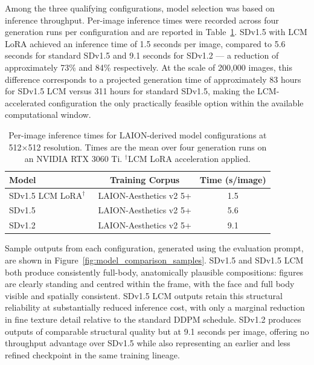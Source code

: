 Among the three qualifying configurations, model selection was based on
inference throughput. Per-image inference times were recorded across four
generation runs per configuration and are reported in
Table~\ref{tab:generative-model-inference-time}. SDv1.5 with LCM LoRA
achieved an inference time of 1.5 seconds per image, compared to 5.6
seconds for standard SDv1.5 and 9.1 seconds for SDv1.2 --- a reduction of
approximately 73\% and 84\% respectively. At the scale of 200{,}000 images,
this difference corresponds to a projected generation time of approximately
83 hours for SDv1.5 LCM versus 311 hours for standard SDv1.5, making the
LCM-accelerated configuration the only practically feasible option within
the available computational window.

\begin{table}[htbp]
	\centering
	\caption{Per-image inference times for LAION-derived model configurations
		at 512$\times$512 resolution. Times are the mean over four generation runs
		on an NVIDIA RTX 3060 Ti. $^\dagger$LCM LoRA acceleration applied.}
	\label{tab:generative-model-inference-time}
	\begin{tabular}{lcc}
		\toprule
		\textbf{Model} & \textbf{Training Corpus} & \textbf{Time (s/image)} \\
		\midrule
		SDv1.5 LCM LoRA$^\dagger$~\cite{StableDiffusion_2022_SD15modelcard, LCMLoRA_SDv15}
		& LAION-Aesthetics v2 5+ & 1.5 \\
		SDv1.5~\cite{StableDiffusion_2022_SD15modelcard}
		& LAION-Aesthetics v2 5+ & 5.6 \\
		SDv1.2~\cite{SD12_ModelCard}
		& LAION-Aesthetics v2 5+ & 9.1 \\
		\bottomrule
	\end{tabular}
\end{table}

Sample outputs from each configuration, generated using the evaluation
prompt, are shown in Figure~\ref{fig:model_comparison_samples}. SDv1.5
and SDv1.5 LCM both produce consistently full-body, anatomically plausible
compositions: figures are clearly standing and centred within the frame,
with the face and full body visible and spatially consistent. SDv1.5 LCM
outputs retain this structural reliability at substantially reduced
inference cost, with only a marginal reduction in fine texture detail
relative to the standard DDPM schedule. SDv1.2 produces outputs of
comparable structural quality but at 9.1 seconds per image, offering no
throughput advantage over SDv1.5 while also representing an earlier and
less refined checkpoint in the same training lineage.

